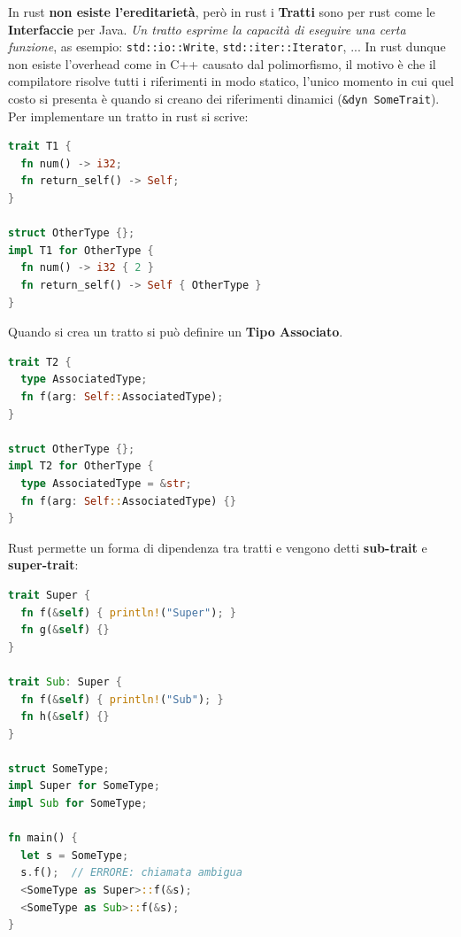 \documentclass[12pt]{article}
\begin{document}
\hfill

In rust \textbf{non esiste l'ereditariet\`a}, per\`o in rust i \textbf{Tratti} sono per rust come le \textbf{Interfaccie} per Java. \emph{Un tratto esprime la capacit\`a di eseguire una certa funzione}, as esempio: \texttt{std::io::Write}, \texttt{std::iter::Iterator}, ... In rust dunque non esiste l'overhead come in C++ causato dal polimorfismo, il motivo \`e che il compilatore risolve tutti i riferimenti in modo statico, l'unico momento in cui quel costo si presenta \`e quando si creano dei riferimenti dinamici (\texttt{\&dyn SomeTrait}). Per implementare un tratto in rust si scrive:
\begin{lstlisting}[language=rust]
trait T1 {
  fn num() -> i32;
  fn return_self() -> Self;
}

struct OtherType {};
impl T1 for OtherType {
  fn num() -> i32 { 2 }
  fn return_self() -> Self { OtherType }
}
\end{lstlisting}
Quando si crea un tratto si pu\`o definire un \textbf{Tipo Associato}.
\begin{lstlisting}[language=rust]
trait T2 {
  type AssociatedType;
  fn f(arg: Self::AssociatedType);
}

struct OtherType {};
impl T2 for OtherType {
  type AssociatedType = &str;
  fn f(arg: Self::AssociatedType) {}
}
\end{lstlisting}
Rust permette un forma di dipendenza tra tratti e vengono detti \textbf{sub-trait} e \textbf{super-trait}:
\begin{lstlisting}[language=rust]
trait Super {
  fn f(&self) { println!("Super"); }
  fn g(&self) {}
}

trait Sub: Super {
  fn f(&self) { println!("Sub"); }
  fn h(&self) {} 
}

struct SomeType;
impl Super for SomeType;
impl Sub for SomeType;

fn main() {
  let s = SomeType;
  s.f();  // ERRORE: chiamata ambigua
  <SomeType as Super>::f(&s);
  <SomeType as Sub>::f(&s);
}
\end{lstlisting}
\end{document}
